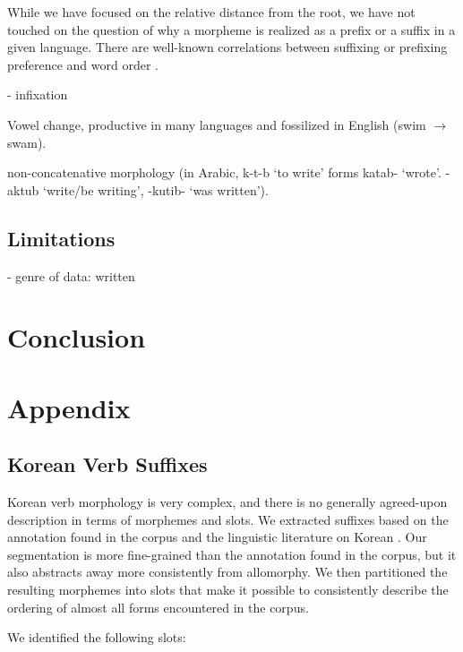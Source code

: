 \documentclass[11pt,letterpaper]{article}
\begin{document}
While we have focused on the relative distance from the root, we have not touched on the question of why a morpheme is realized as a prefix or a suffix in a given language.
There are well-known correlations between suffixing or prefixing preference and word order \citep{greenberg1963universals}.

- infixation

Vowel change, productive in many languages and fossilized in English (swim $\rightarrow$ swam).

non-concatenative morphology (in Arabic, k-t-b `to write' forms katab- `wrote'. -aktub `write/be writing', -kutib- `was written').

\subsection{Limitations}

- genre of data: written



\section{Conclusion}



\appendix

\section{Appendix}



\subsection{Korean Verb Suffixes}

Korean verb morphology is very complex, and there is no generally agreed-upon description in terms of morphemes and slots.
We extracted suffixes based on the annotation found in the corpus and the linguistic literature on Korean \citep[4.1.2]{yeon2010korean}.
Our segmentation is more fine-grained than the annotation found in the corpus, but it also abstracts away more consistently from allomorphy.
We then partitioned the resulting morphemes into slots that make it possible to consistently describe the ordering of almost all forms encountered in the corpus.


We identified the following slots:
\end{document}
